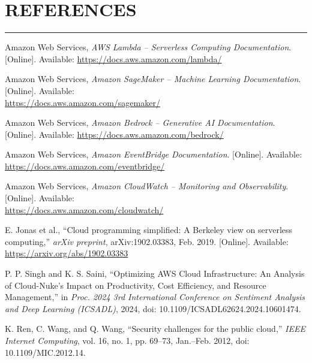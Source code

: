 \documentclass[12pt, a4paper, oneside]{report}
\begin{document}
\chapter*{\vspace{-1cm}REFERENCES}
\thispagestyle{fancy}

\begin{center}
    \rule{\linewidth}{0.4pt}
\end{center}

\vspace{0.4cm}

\begin{enumerate}[leftmargin=1.5cm, label={[\arabic*]}, itemsep=0.3cm]
\justifying

    \item Amazon Web Services, \textit{AWS Lambda -- Serverless Computing Documentation}. [Online]. Available: \url{https://docs.aws.amazon.com/lambda/}

    \item Amazon Web Services, \textit{Amazon SageMaker -- Machine Learning Documentation}. [Online]. Available: \\ \url{https://docs.aws.amazon.com/sagemaker/}

    \item Amazon Web Services, \textit{Amazon Bedrock -- Generative AI Documentation}. [Online]. Available: \url{https://docs.aws.amazon.com/bedrock/}

    \item Amazon Web Services, \textit{Amazon EventBridge Documentation}. [Online]. Available: \url{https://docs.aws.amazon.com/eventbridge/}

    \item Amazon Web Services, \textit{Amazon CloudWatch -- Monitoring and Observability}. [Online]. Available: \\ \url{https://docs.aws.amazon.com/cloudwatch/}

    \item E. Jonas et al., ``Cloud programming simplified: A Berkeley view on serverless computing,'' \textit{arXiv preprint}, arXiv:1902.03383, Feb. 2019. [Online]. Available: \url{https://arxiv.org/abs/1902.03383}

    \item P. P. Singh and K. S. Saini, ``Optimizing AWS Cloud Infrastructure: An Analysis of Cloud-Nuke's Impact on Productivity, Cost Efficiency, and Resource Management,'' in \textit{Proc. 2024 3rd International Conference on Sentiment Analysis and Deep Learning (ICSADL)}, 2024, doi: 10.1109/ICSADL62624.2024.10601474.

   

    \item K. Ren, C. Wang, and Q. Wang, ``Security challenges for the public cloud,'' \textit{IEEE Internet Computing}, vol. 16, no. 1, pp. 69--73, Jan.--Feb. 2012, doi: 10.1109/MIC.2012.14.

\end{enumerate}
\end{document}
